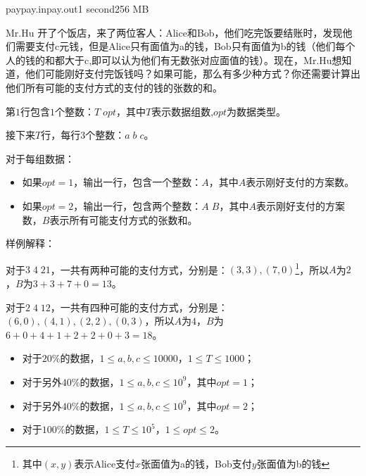 \documentclass[11pt,a4paper,oneside]{article}
\begin{document}
\begin{problem}{pay}{pay.in}{pay.out}{1 second}{256 MB}

	Mr.Hu 开了个饭店，来了两位客人：Alice和Bob，他们吃完饭要结账时，发现他们需要支付c元钱，但是Alice只有面值为a的钱，Bob只有面值为b的钱（他们每个人的钱的和都大于c,即可以认为他们有无数张对应面值的钱）。现在，Mr.Hu想知道，他们可能刚好支付完饭钱吗？如果可能，那么有多少种方式？你还需要计算出他们所有可能的支付方式的支付的钱的张数的和。

    \InputFile

    第$1$行包含$1$个整数：$T \; opt$，其中$T$表示数据组数,$opt$为数据类型。

	接下来$T$行，每行$3$个整数：$a \; b\; c$。

    \OutputFile
    
    对于每组数据：
    \begin{itemize}
    	\item 如果$opt = 1$，输出一行，包含一个整数：$A$，其中$A$表示刚好支付的方案数。
    	\item 如果$opt = 2$，输出一行，包含两个整数：$A \; B$，其中$A$表示刚好支付的方案数，$B$表示所有可能支付方式的张数和。
    \end{itemize}
    
    \Example

    \begin{example}
    \end{example}
	
	样例解释：
	
	对于$3 \; 4 \; 21$，一共有两种可能的支付方式，分别是：$(3,3), (7,0)$\footnote{其中$(x,y)$表示Alice支付$x$张面值为a的钱，Bob支付$y$张面值为b的钱}，所以$A$为$2$，$B$为$3 + 3 + 7 + 0 = 13$。
	
	对于$2 \; 4 \; 12$，一共有四种可能的支付方式，分别是：$(6,0),(4,1),(2,2),(0,3)$，所以$A$为$4$，$B$为$6 + 0 + 4 + 1 + 2 + 2 + 0 + 3 = 18$。
	
    \Note
    
    \begin{itemize}
		\item 对于$20\%$的数据，$1 \leq a, b, c \leq 10000$，$1 \leq T \leq 1000$；
		\item 对于另外$40\%$的数据，$1 \leq a, b, c \leq 10^9$，其中$opt = 1$；
		\item 对于另外$40\%$的数据，$1 \leq a, b, c \leq 10^9$，其中$opt = 2$；
		\item 对于$100\%$的数据，$1 \leq T \leq 10^5$，$1 \leq opt \leq 2$。
    \end{itemize}

\end{problem}
\end{document}
